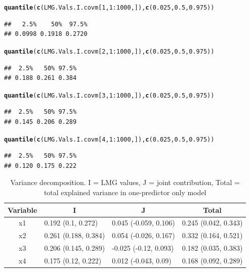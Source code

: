 \documentclass[11pt,a4paper,twoside]{book}
\makeatletter
\newcommand{\hlnum}[1]{\textcolor[rgb]{0.686,0.059,0.569}{#1}}%
\newcommand{\hlopt}[1]{\textcolor[rgb]{0,0,0}{#1}}%
\newcommand{\hlstd}[1]{\textcolor[rgb]{0.345,0.345,0.345}{#1}}%
\newcommand{\hlkwd}[1]{\textcolor[rgb]{0.737,0.353,0.396}{\textbf{#1}}}%
\newenvironment{kframe}{%
 \def\at@end@of@kframe{}%
 \ifinner\ifhmode%
  \def\at@end@of@kframe{\end{minipage}}%
  \begin{minipage}{\columnwidth}%
 \fi\fi%
 \def\FrameCommand##1{\hskip\@totalleftmargin \hskip-\fboxsep
 \colorbox{shadecolor}{##1}\hskip-\fboxsep
     \hskip-\linewidth \hskip-\@totalleftmargin \hskip\columnwidth}%
 \MakeFramed {\advance\hsize-\width
   \@totalleftmargin\z@ \linewidth\hsize
   \@setminipage}}%
 {\par\unskip\endMakeFramed%
 \at@end@of@kframe}
\newenvironment{knitrout}{}{} %
\makeatother
\begin{document}
\begin{knitrout}
\begin{kframe}
\begin{alltt}
\hlkwd{quantile}\hlstd{(}\hlkwd{c}\hlstd{(LMG.Vals.I.covm[}\hlnum{1}\hlstd{,}\hlnum{1}\hlopt{:}\hlnum{1000}\hlstd{,]),} \hlkwd{c}\hlstd{(}\hlnum{0.025}\hlstd{,} \hlnum{0.5}\hlstd{,} \hlnum{0.975}\hlstd{))}
\end{alltt}
\begin{verbatim}
##   2.5%    50%  97.5% 
## 0.0998 0.1918 0.2720
\end{verbatim}
\begin{alltt}
\hlkwd{quantile}\hlstd{(}\hlkwd{c}\hlstd{(LMG.Vals.I.covm[}\hlnum{2}\hlstd{,}\hlnum{1}\hlopt{:}\hlnum{1000}\hlstd{,]),} \hlkwd{c}\hlstd{(}\hlnum{0.025}\hlstd{,} \hlnum{0.5}\hlstd{,} \hlnum{0.975}\hlstd{))}
\end{alltt}
\begin{verbatim}
##  2.5%   50% 97.5% 
## 0.188 0.261 0.384
\end{verbatim}
\begin{alltt}
\hlkwd{quantile}\hlstd{(}\hlkwd{c}\hlstd{(LMG.Vals.I.covm[}\hlnum{3}\hlstd{,}\hlnum{1}\hlopt{:}\hlnum{1000}\hlstd{,]),} \hlkwd{c}\hlstd{(}\hlnum{0.025}\hlstd{,} \hlnum{0.5}\hlstd{,} \hlnum{0.975}\hlstd{))}
\end{alltt}
\begin{verbatim}
##  2.5%   50% 97.5% 
## 0.145 0.206 0.289
\end{verbatim}
\begin{alltt}
\hlkwd{quantile}\hlstd{(}\hlkwd{c}\hlstd{(LMG.Vals.I.covm[}\hlnum{4}\hlstd{,}\hlnum{1}\hlopt{:}\hlnum{1000}\hlstd{,]),} \hlkwd{c}\hlstd{(}\hlnum{0.025}\hlstd{,} \hlnum{0.5}\hlstd{,} \hlnum{0.975}\hlstd{))}
\end{alltt}
\begin{verbatim}
##  2.5%   50% 97.5% 
## 0.120 0.175 0.222
\end{verbatim}
\end{kframe}
\end{knitrout}


\begin{table}[h]
\centering
\begin{tabular}{clll}
  \hline
  \multicolumn{1}{c}{\textbf{Variable}} & \multicolumn{1}{c}{\textbf{I}} &\multicolumn{1}{c}{\textbf{J}} & \multicolumn{1}{c}{\textbf{Total}} \\
  \hline
x1 & 0.192 (0.1, 0.272)  & 0.045 (-0.059, 0.106)   & 0.245 (0.042, 0.343)  \\ 
x2 & 0.261 (0.188, 0.384)  & 0.054 (-0.026, 0.167)   & 0.332 (0.164, 0.521)  \\ 
x3 & 0.206 (0.145, 0.289)  & -0.025 (-0.12, 0.093)   & 0.182 (0.035, 0.383)  \\ 
x4 & 0.175 (0.12, 0.222)  & 0.012 (-0.043, 0.09)   & 0.168 (0.092, 0.289)  \\ 

   \hline
\end{tabular}
\caption{Variance decomposition. I = LMG values, J = joint contribution, Total = total explained variance in one-predictor only model}
\label{tbl:fundus.to.SLO3}
\end{table}
\end{document}
